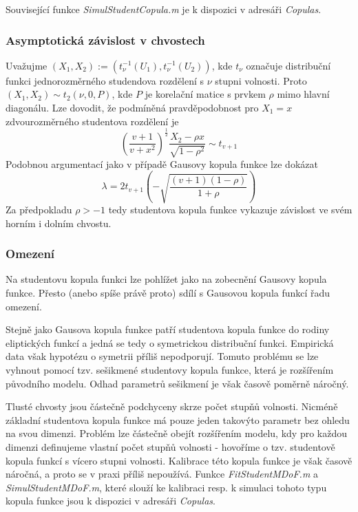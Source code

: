 Související funkce \textit{SimulStudentCopula.m} je k dispozici v adresáři \textit{Copulas}.

\subsubsection{Asymptotická závislost v chvostech}

Uvažujme $(X_1, X_2) := (t_{\nu}^{-1}(U_1), t_{\nu}^{-1}(U_2))$, kde $t_{\nu}$ označuje distribuční funkci jednorozměrného studendova rozdělení s $\nu$ stupni volnosti. Proto $(X_1, X_2) \sim t_2(\nu, 0, P)$, kde $P$ je korelační matice s prvkem $\rho$ mimo hlavní diagonálu. Lze dovodit, že podmíněná pravděpodobnost pro $X_1 = x$ zdvourozměrného studentova rozdělení je
\begin{equation*}
\left(\frac{v + 1}{v + x^2}\right)^{\frac{1}{2}} \frac{X_2 - \rho x}{\sqrt{1 - \rho^2}} \sim t_{v + 1}
\end{equation*}
Podobnou argumentací jako v případě Gausovy kopula funkce lze dokázat
\begin{equation*}
\lambda = 2 t_{v + 1} \left(-\sqrt{\frac{(v + 1)(1 - \rho)}{1 + \rho}}\right)
\end{equation*}
Za předpokladu $\rho > - 1$ tedy studentova kopula funkce vykazuje závislost ve svém horním i dolním chvostu.

\subsubsection{Omezení}

Na studentovu kopula funkci lze pohlížet jako na zobecnění Gausovy kopula funkce. Přesto (anebo spíše právě proto) sdílí s Gausovou kopula funkcí řadu omezení.

Stejně jako Gausova kopula funkce patří studentova kopula funkce do rodiny eliptických funkcí a jedná se tedy o symetrickou distribuční funkci. Empirická data však hypotézu o symetrii příliš nepodporují. Tomuto problému se lze vyhnout pomocí tzv. sešikmené studentovy kopula funkce, která je rozšířením původního modelu. Odhad parametrů sešikmení je však časově poměrně náročný.

Tlusté chvosty jsou částečně podchyceny skrze počet stupňů volnosti. Nicméně základní studentova kopula funkce má pouze jeden takovýto parametr bez ohledu na svou dimenzi. Problém lze částečně obejít rozšířením modelu, kdy pro každou dimenzi definujeme vlastní počet stupňů volnosti - hovoříme o tzv. studentově kopula funkcí s vícero stupni volnosti. Kalibrace této kopula funkce je však časově náročná, a proto se v praxi příliš nepoužívá. Funkce \textit{FitStudentMDoF.m} a \textit{SimulStudentMDoF.m}, které slouží ke kalibraci resp. k simulaci tohoto typu kopula funkce jsou k dispozici v adresáři \textit{Copulas}.

